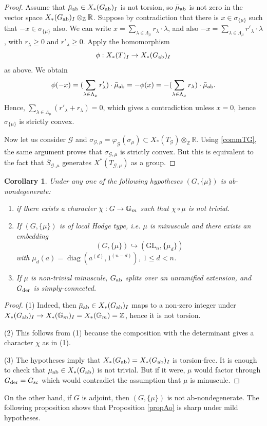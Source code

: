 \documentclass[reqno, 10pt]{amsart}
\makeatletter
\newcommand{\BG}{\ensuremath{\mathbb {G}}\xspace}
\newcommand{\BR}{\ensuremath{\mathbb {R}}\xspace}
\newcommand{\BZ}{\ensuremath{\mathbb {Z}}\xspace}
\newcommand{\CG}{\ensuremath{\mathcal {G}}\xspace}
\DeclareMathOperator{\diag}{diag}
\newcommand{\GL}{\mathrm{GL}}
\newcommand{\ov}{\overline}
\newtheorem{corollary}[subsubsection]{Corollary}
\theoremstyle{definition}
\numberwithin{equation}{subsection}
\numberwithin{subsubsection}{subsection}
\renewcommand{\to}{%
   \ifbool{@display}{\longrightarrow}{\rightarrow}%
   }
\newcommand{\der}{{\rm der}}
\makeatother
\begin{document}
\begin{proof} Assume that $\bar\mu_{\rm ab}\in X_*(G_{\rm ab})_I$ is not torsion, so $\bar\mu_{\rm ab}$ is not zero in the vector space $ X_*(G_{\rm ab})_I\otimes_{\BZ}\BR$. Suppose by contradiction that there is $x\in \sigma_{\{\mu\}}$ such that $-x\in \sigma_{\{\mu\}}$ also. 
We can write $x=\sum_{\lambda\in \Lambda_\mu}r_\lambda\cdot \lambda$, and also
$-x=\sum_{\lambda\in \Lambda_\mu}r'_\lambda\cdot \lambda$, with  $r_\lambda\geq 0$ and $r'_\lambda\geq 0$. Apply the homomorphism 
\[
\phi: X_*(T)_I\to  X_*(G_{\rm ab})_I
\]
as above.  We obtain 
\[
\phi(-x)=(\sum_{\lambda\in \Lambda_\mu}r'_\lambda)\cdot \bar\mu_{\rm ab}=-\phi(x)=-(\sum_{\lambda\in \Lambda_\mu}r_\lambda)\cdot \bar\mu_{\rm ab}.
\]
Hence, $\sum_{\lambda\in \Lambda_\mu}(r'_\lambda+r_\lambda)=0$, which gives a contradiction unless $x=0$, hence $\sigma_{\{\mu\}}$ is strictly convex. 

Now let us consider $\CG$ and $\sigma_{\CG, \mu}=\varphi_\CG(\sigma_\mu)\subset X_*(T_\CG)\otimes_{\BZ}\BR$. Using \eqref{commTG}, the same argument proves that $\sigma_{\CG, \mu}$ is strictly convex. But this is equivalent to the fact that $\ov S_{\CG, \mu}$ generates $X^*(T_{\CG, \mu})$ as a group. 
\end{proof}
 
\begin{corollary}\label{cor:Hodgetype} Under any one of the following hypotheses $(G, \{\mu\})$ is ab-nondegenerate:
\begin{enumerate}
\item if there exists a character $\chi: G\to \BG_m$ such that $\chi\circ \mu$ is not trivial.

\item If $(G, \{\mu\})$ is of local Hodge type, i.e. $\mu$ is minuscule and   there exists an embedding
\[
  (G, \{\mu\})\hookrightarrow (\GL_n,\{\mu_d\})
\]
with $\mu_d(a)=\diag(a^{(d)}, 1^{(n-d)})$,  $1\leq d<n$. 

\item If $\mu$ is non-trivial minuscule, $G_{\rm ab}$ splits over an unramified extension,
and $G_\der$ is simply-connected.
\end{enumerate}
\end{corollary}
\begin{proof}
(1)  Indeed,  then $\bar\mu_{\rm ab}\in X_*(G_{\rm ab})_I$ maps to a non-zero integer under $X_*(G_{\rm ab})_I\to X_*(\BG_m)_I=X_*(\BG_m)=\BZ$, hence it is not torsion.

(2) This follows from (1) because the composition with the determinant gives   a character $\chi$ as in (1).

(3) The hypotheses imply that 
$X_*(G_{\rm ab})=X_*(G_{\rm ab})_I$ is torsion-free. It is enough to check that $ \mu_{\rm ab}\in X_*(G_{\rm ab})$ is not trivial. But if it were, 
$\mu$ would factor through $G_\der=G_{\rm sc}$ which would contradict the assumption that $\mu$ is minuscule. 
\end{proof}
On the other hand, if $G$ is adjoint, then $(G, \{\mu\})$ is not ab-nondegenerate. The following proposition shows that Proposition  \ref{propAo}  is sharp under mild hypotheses.
\end{document}
